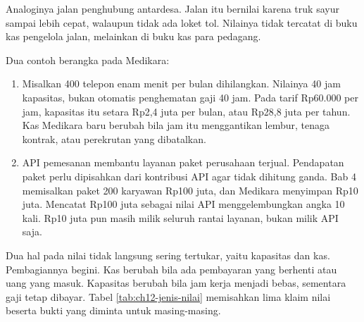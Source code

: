 Analoginya jalan penghubung antardesa. Jalan itu bernilai karena truk sayur sampai lebih cepat, walaupun tidak ada loket tol.
Nilainya tidak tercatat di buku kas pengelola jalan, melainkan di buku kas para pedagang.

Dua contoh berangka pada Medikara:
\begin{enumerate}
  \item Misalkan 400 telepon enam menit per bulan dihilangkan. Nilainya 40 jam kapasitas, bukan otomatis penghematan gaji 40
        jam. Pada tarif Rp60.000 per jam, kapasitas itu setara Rp2,4 juta per bulan, atau Rp28,8 juta per tahun. Kas Medikara
        baru berubah bila jam itu menggantikan lembur, tenaga kontrak, atau perekrutan yang dibatalkan.
  \item API pemesanan membantu layanan paket perusahaan terjual. Pendapatan paket perlu dipisahkan dari kontribusi API agar
        tidak dihitung ganda. Bab 4 memisalkan paket 200 karyawan Rp100 juta, dan Medikara menyimpan Rp10 juta. Mencatat
        Rp100 juta sebagai nilai API menggelembungkan angka 10 kali. Rp10 juta pun masih milik seluruh rantai layanan, bukan
        milik API saja.
\end{enumerate}

Dua hal pada nilai tidak langsung sering tertukar, yaitu kapasitas dan kas. Pembagiannya begini. Kas berubah bila ada pembayaran
yang berhenti atau uang yang masuk. Kapasitas berubah bila jam kerja menjadi bebas, sementara gaji tetap dibayar. Tabel
\ref{tab:ch12-jenis-nilai} memisahkan lima klaim nilai beserta bukti yang diminta untuk masing-masing.

